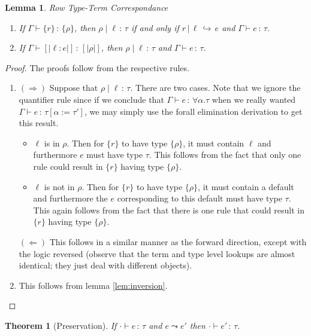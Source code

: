 \documentclass{article}
\newtheorem{theorem}{Theorem}
\newtheorem{lemma}{Lemma}
\newcommand{\variant}[1]{[\!|#1|\!]}
\newcommand{\hastp}[3]{#1 \vdash #2 \,:\, #3}
\newcommand{\haslbl}[3]{#1\;|\;#2\,:\, #3}
\newcommand{\haslbltm}[3]{#1\,|\,#2\,\hookrightarrow\, #3}
\newcommand{\step}[2]{#1 \leadsto #2}
\begin{document}
\begin{lemma}{Row Type-Term Correspondance} \label{lem:row-type-term}
  \mbox{}
  \begin{enumerate}
  \item If \(\hastp \Gamma {\{r\}} {\{\rho\}}\), then \(\haslbl \rho \ell \tau\)
    if and only if \(\haslbltm r \ell e\) and \(\hastp \Gamma e \tau\).
  \item If \(\hastp \Gamma {\variant {\ell : e}} {\variant \rho}\), then
    \(\haslbl \rho \ell \tau\) and \(\hastp \Gamma e \tau\).
  \end{enumerate}
\end{lemma}

\begin{proof}
  The proofs follow from the respective rules.
  \mbox{}
  \begin{enumerate}
  \item \((\Rightarrow)\) Suppose that \(\haslbl \rho \ell \tau\). There are two
    cases. Note that we ignore the quantifier rule since if we conclude that
    \(\hastp \Gamma e {\forall \alpha. \tau}\) when we really wanted \(\hastp
    \Gamma e {\tau[\alpha := \tau']}\), we may simply use the forall elimination
    derivation to get this result.
    \begin{itemize}
    \item \(\ell\) is in \(\rho\). Then for \(\{r\}\) to have type \(\{\rho\}\), it
      must contain \(\ell\) and furthermore \(e\) must have type \(\tau\). This
      follows from the fact that only one rule could result in \(\{r\}\) having
      type \(\{\rho\}\).
    \item \(\ell\) is not in \(\rho\). Then for \(\{r\}\) to have type
      \(\{\rho\}\), it must contain a default and furthermore the \(e\)
      corresponding to this default must have type \(\tau\). This again follows
      from the fact that there is one rule that could result in \(\{r\}\) having
      type \(\{\rho\}\).
    \end{itemize}

    \((\Leftarrow)\) This follows in a similar manner as the forward direction,
    except with the logic reversed (observe that the term and type level lookups
    are almost identical; they just deal with different objects).
  \item This follows from lemma \ref{lem:inversion}.
  \end{enumerate}
\end{proof}

\begin{theorem}[Preservation]
If $\hastp{\cdot}{e}{\tau}$ and $\step{e}{e'}$ then $\hastp{\cdot}{e'}{\tau}$.
\end{theorem}
\end{document}
